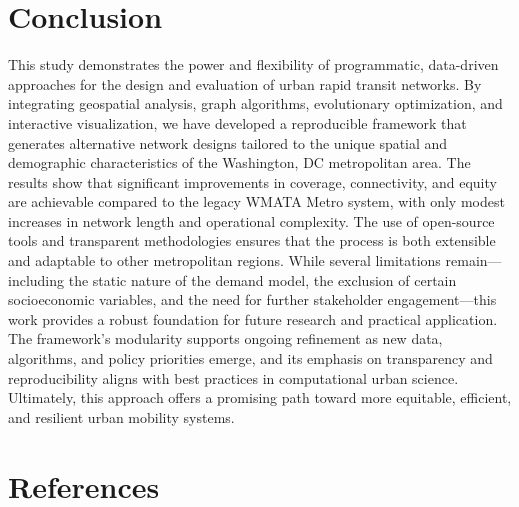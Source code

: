 \documentclass[manuscript,screen,review]{acmart}
\begin{document}
\section{Conclusion}

This study demonstrates the power and flexibility of programmatic, data-driven approaches for the design and evaluation of urban rapid transit networks. By integrating geospatial analysis, graph algorithms, evolutionary optimization, and interactive visualization, we have developed a reproducible framework that generates alternative network designs tailored to the unique spatial and demographic characteristics of the Washington, DC metropolitan area. The results show that significant improvements in coverage, connectivity, and equity are achievable compared to the legacy WMATA Metro system, with only modest increases in network length and operational complexity. The use of open-source tools and transparent methodologies ensures that the process is both extensible and adaptable to other metropolitan regions. While several limitations remain—including the static nature of the demand model, the exclusion of certain socioeconomic variables, and the need for further stakeholder engagement—this work provides a robust foundation for future research and practical application. The framework's modularity supports ongoing refinement as new data, algorithms, and policy priorities emerge, and its emphasis on transparency and reproducibility aligns with best practices in computational urban science. Ultimately, this approach offers a promising path toward more equitable, efficient, and resilient urban mobility systems.

\section{References}



\end{document}
